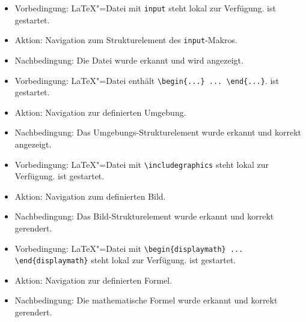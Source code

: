 \begin{itemize}
  \item Vorbedingung: \LaTeX"=Datei mit \verb|input| steht lokal zur Verfügung.
  \texla{} ist gestartet.
  \item Aktion: Navigation zum Strukturelement des \verb|input|-Makros.
  \item Nachbedingung: Die Datei wurde erkannt und wird angezeigt.
\end{itemize}

\begin{itemize}
  \item Vorbedingung: \LaTeX"=Datei enthält \verb|\begin{...} ... \end{...}|.
  \texla{} ist gestartet.
  \item Aktion: Navigation zur definierten Umgebung.
  \item Nachbedingung: Das Umgebungs-Strukturelement wurde erkannt und korrekt angezeigt.
\end{itemize}

\begin{itemize}
  \item Vorbedingung: \LaTeX"=Datei mit \verb|\includegraphics| steht lokal zur Verfügung.
  \texla{} ist gestartet.
  \item Aktion: Navigation zum definierten Bild.
  \item Nachbedingung: Das Bild-Strukturelement wurde erkannt und korrekt gerendert.
\end{itemize}

\begin{itemize}
  \item Vorbedingung: \LaTeX"=Datei mit \verb|\begin{displaymath} ... \end{displaymath}| steht lokal zur Verfügung.
  \texla{} ist gestartet.
  \item Aktion: Navigation zur definierten Formel.
  \item Nachbedingung: Die mathematische Formel wurde erkannt und korrekt gerendert.
\end{itemize}

\clearpage

